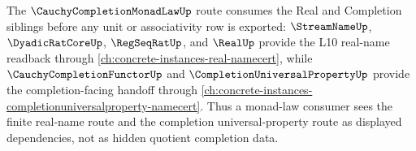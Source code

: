 The $\CauchyCompletionMonadLawUp$ route consumes the Real and Completion siblings before any unit or associativity row is exported: $\StreamNameUp$, $\DyadicRatCoreUp$, $\RegSeqRatUp$, and $\RealUp$ provide the L10 real-name readback through \autoref{ch:concrete-instances-real-namecert}, while $\CauchyCompletionFunctorUp$ and $\CompletionUniversalPropertyUp$ provide the completion-facing handoff through \autoref{ch:concrete-instances-completionuniversalproperty-namecert}. Thus a monad-law consumer sees the finite real-name route and the completion universal-property route as displayed dependencies, not as hidden quotient completion data.
